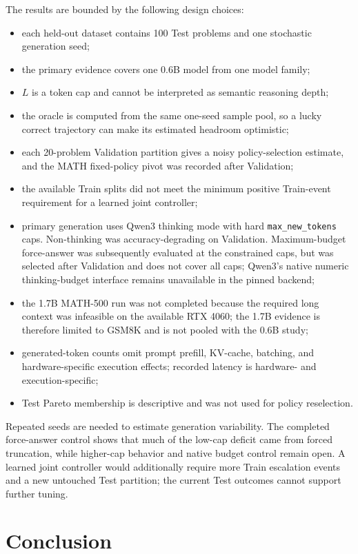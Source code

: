 \documentclass[runningheads]{llncs}
\begin{document}
The results are bounded by the following design choices:
\begin{itemize}
  \item each held-out dataset contains 100 Test problems and one
  stochastic generation seed;
  \item the primary evidence covers one 0.6B model from one model family;
  \item $L$ is a token cap and cannot be interpreted as semantic reasoning
  depth;
  \item the oracle is computed from the same one-seed sample pool, so a
  lucky correct trajectory can make its estimated headroom optimistic;
  \item each 20-problem Validation partition gives a noisy policy-selection
  estimate, and the MATH fixed-policy pivot was recorded after Validation;
  \item the available Train splits did not meet the minimum positive
  Train-event requirement for a learned joint controller;
  \item primary generation uses Qwen3 thinking mode with hard
  \texttt{max\_new\_tokens} caps. Non-thinking was accuracy-degrading on
  Validation. Maximum-budget force-answer was subsequently evaluated at the
  constrained caps, but was selected after Validation and does not cover all
  caps; Qwen3's native numeric thinking-budget interface remains unavailable
  in the pinned backend;
  \item the 1.7B MATH-500 run was not completed because the required long
  context was infeasible on the available RTX 4060; the 1.7B evidence is
  therefore limited to GSM8K and is not pooled with the 0.6B study;
  \item generated-token counts omit prompt prefill, KV-cache, batching, and
  hardware-specific execution effects; recorded latency is hardware- and
  execution-specific;
  \item Test Pareto membership is descriptive and was not used for policy
  reselection.
\end{itemize}

Repeated seeds are needed to estimate generation variability. The completed
force-answer control shows that much of the low-cap deficit came from forced
truncation, while higher-cap behavior and native budget control remain open. A learned
joint controller would additionally require more Train escalation events and a
new untouched Test partition; the current Test outcomes cannot support further
tuning.

\section{Conclusion}
\end{document}
